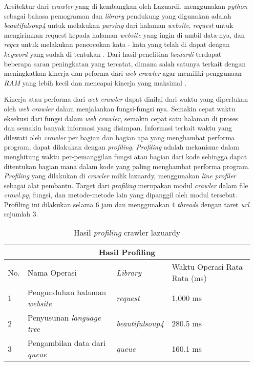 Arsitektur dari \emph{crawler} yang di kembangkan oleh Lazuardi, menggunakan \emph{python} sebagai bahasa pemograman dan \emph{library} pendukung yang digunakan adalah \emph{beautifulsoup4} untuk melakukan \emph{parsing} dari halaman \emph{website}, \emph{request} untuk mengirimkan request kepada halaman \emph{website} yang ingin di ambil data-nya, dan \emph{regex} untuk melakukan pencocokan kata - kata yang telah di dapat dengan \emph{keyword} yang sudah di tentukan \citep{lazuardithesis}. Dari hasil penelitian \emph{lazuardi} terdapat beberapa saran peningkatan yang tercatat, dimana salah satunya terkait dengan meningkatkan kinerja dan peforma dari \emph{web crawler} agar memiliki penggunaan \emph{RAM} yang lebih kecil dan mencapai kinerja yang maksimal \citep{lazuardithesis}.

Kinerja atau performa dari \emph{web crawler} dapat dinilai dari waktu yang diperlukan oleh \emph{web crawler} dalam menjalankan fungsi-fungsi nya. Semakin cepat waktu eksekusi dari fungsi dalam \emph{web crawler}, semakin cepat satu halaman di proses dan semakin banyak informasi yang disimpan. Informasi terkait waktu yang dilewati oleh \emph{crawler} per bagian dan bagian apa yang menghambat performa program, dapat dilakukan dengan \emph{profiling}. \emph{Profiling} adalah mekanisme dalam menghitung waktu per-pemanggilan fungsi atau bagian dari kode sehingga dapat ditentukan bagian mana dalam kode yang paling menghambat performa program. \emph{Profiling} yang dilakukan di \emph{crawler} milik lazuardy, menggunakan \emph{line profiler} sebagai alat pembantu. Target dari \emph{profiling} merupakan modul \emph{crawler} dalam file \emph{crawl.py}, fungsi, dan metode-metode lain yang dipanggil oleh modul tersebut. Profiling ini dilakukan selama 6 jam dan menggunakan 4 \emph{threads} dengan taret \emph{url} sejumlah 3.

\begin{table}[H]
  \caption{Hasil \emph{profiling} crawler lazuardy}
  \begin{center}
    \begin{tabular}{ |p{1cm}|p{5cm}|p{4cm}|p{3cm}| } \hline
      \multicolumn{4}{|c|}{Hasil Profiling} \\ \hline
      No.& Nama Operasi& \emph{Library}& Waktu Operasi Rata-Rata (ms) \\ \hline
      1& Pengunduhan halaman \emph{website}& \emph{request}& 1,000 ms \\ \hline
      2& Penyusunan \emph{language tree}& \emph{beautifulsoup4}& 280.5 ms \\ \hline
      3& Pengambilan data dari \emph{queue}& \emph{queue}& 160.1 ms \\ \hline
    \end{tabular}
  \end{center}
\end{table}

